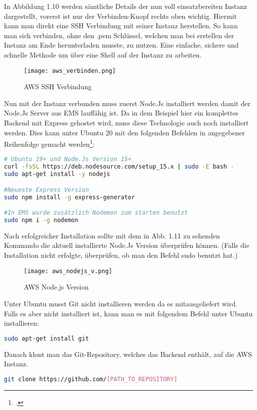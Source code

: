 In Abbildung 1.10 werden sämtliche Details der nun voll einsatzbereiten Instanz dargestellt, vorerst ist nur der Verbinden-Knopf rechts oben wichtig. Hiermit kann man direkt eine SSH Verbindung mit seiner Instanz herstellen.
So kann man sich verbinden, ohne den .pem Schlüssel, welchen man bei erstellen der Instanz am Ende herunterladen musste, zu nutzen. Eine einfache, sichere und schnelle Methode um über eine Shell auf der Instanz zu arbeiten.
\begin{center}
\begin{figure}[H]
    \centering
    \texttt{[image: aws\_verbinden.png]}
    \caption{AWS SSH Verbindung}
\end{figure}
\end{center}
Nun mit der Instanz verbunden muss zuerst Node.Js installiert werden damit der Node.Js Server aus EMS lauffähig ist. Da in dem Beispiel hier ein komplettes Backend mit Express gehostet wird, muss diese Technologie auch noch installiert werden. Dies kann unter Ubuntu 20 mit den folgenden Befehlen in angegebener Reihenfolge gemacht werden\footcite{deploy-nodejs1}:
\begin{lstlisting}[language=bash]
# Ubuntu 19+ und Node.Js Version 15+
curl -fsSL https://deb.nodesource.com/setup_15.x | sudo -E bash -
sudo apt-get install -y nodejs

#Neueste Express Version
sudo npm install -g express-generator

#In EMS wurde zusätzlich Nodemon zum starten benutzt
sudo npm i -g nodemon
\end{lstlisting}
Nach erfolgreicher Installation sollte mit dem in Abb. 1.11 zu sehenden Kommando die aktuell installierte Node.Js Version überprüfen können.
(Falls die Installation nicht erfolgte, überprüfen, ob man den Befehl sudo benutzt hat.)
\begin{center}
\begin{figure}[H]
    \centering
    \texttt{[image: aws\_nodejs\_v.png]}
    \caption{AWS Node.js Version}
\end{figure}
\end{center}
Unter Ubuntu musst Git nicht installieren werden da es mitausgeliefert wird. Falls es aber nicht installiert ist, kann man es mit folgendem Befehl unter Ubuntu installieren:
\begin{lstlisting}[language=bash]
sudo apt-get install git
\end{lstlisting}
Danach klont man das Git-Repository, welches das Backend enthält, auf die AWS Instanz.
\begin{lstlisting}[language=bash]
git clone https://github.com/[PATH_TO_REPOSITORY]
\end{lstlisting}
